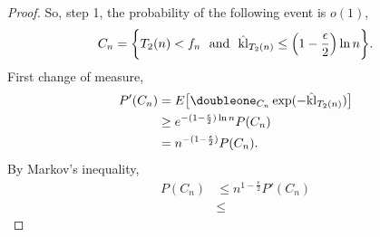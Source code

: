 \begin{proof}
    So, step 1, the probability of the following event is $o(1)$,
    \begin{align}
        C_n=\bigg\{ T_2(n)<f_n
            ~~\text{and}~~
            \hat {{\mathop{\mathrm{kl}}}}_{T_2(n)} \le \Big(1-\frac{\epsilon}{2}\Big)\ln n \bigg\}.
    \end{align}
    First change of measure,
    \begin{align}
        P'(C_n)
            &= E\big[\doubleone_{C_n} \exp(-\hat\kl_{T_2(n)})\big] \\
            &\ge e^{-(1-\frac{\epsilon}{2})\ln n} P(C_n) \\
            &= n^{-(1-\frac{\epsilon}{2})} P(C_n).
    \end{align}
    By Markov's inequality,
    \begin{align}
        P(C_n)
            &\le n^{1-\frac{\epsilon}{2}} P'(C_n) \\
            &\le
    \end{align}

\end{proof}
